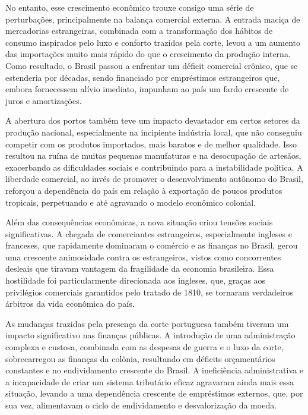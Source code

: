 \documentclass[a4paper,12pt]{article}[abntex2]
\begin{document}
No entanto, esse crescimento econômico trouxe consigo uma série de perturbações, principalmente na balança comercial externa. A entrada maciça de mercadorias estrangeiras, combinada com a transformação dos hábitos de consumo inspirados pelo luxo e conforto trazidos pela corte, levou a um aumento das importações muito mais rápido do que o crescimento da produção interna. Como resultado, o Brasil passou a enfrentar um déficit comercial crônico, que se estenderia por décadas, sendo financiado por empréstimos estrangeiros que, embora fornecessem alívio imediato, impunham ao país um fardo crescente de juros e amortizações.

A abertura dos portos também teve um impacto devastador em certos setores da produção nacional, especialmente na incipiente indústria local, que não conseguiu competir com os produtos importados, mais baratos e de melhor qualidade. Isso resultou na ruína de muitas pequenas manufaturas e na desocupação de artesãos, exacerbando as dificuldades sociais e contribuindo para a instabilidade política. A liberdade comercial, ao invés de promover o desenvolvimento autônomo do Brasil, reforçou a dependência do país em relação à exportação de poucos produtos tropicais, perpetuando e até agravando o modelo econômico colonial.

Além das consequências econômicas, a nova situação criou tensões sociais significativas. A chegada de comerciantes estrangeiros, especialmente ingleses e franceses, que rapidamente dominaram o comércio e as finanças no Brasil, gerou uma crescente animosidade contra os estrangeiros, vistos como concorrentes desleais que tiravam vantagem da fragilidade da economia brasileira. Essa hostilidade foi particularmente direcionada aos ingleses, que, graças aos privilégios comerciais garantidos pelo tratado de 1810, se tornaram verdadeiros árbitros da vida econômica do país.

As mudanças trazidas pela presença da corte portuguesa também tiveram um impacto significativo nas finanças públicas. A introdução de uma administração complexa e custosa, combinada com as despesas de guerra e o luxo da corte, sobrecarregou as finanças da colônia, resultando em déficits orçamentários constantes e no endividamento crescente do Brasil. A ineficiência administrativa e a incapacidade de criar um sistema tributário eficaz agravaram ainda mais essa situação, levando a uma dependência crescente de empréstimos externos, que, por sua vez, alimentavam o ciclo de endividamento e desvalorização da moeda.
\end{document}
